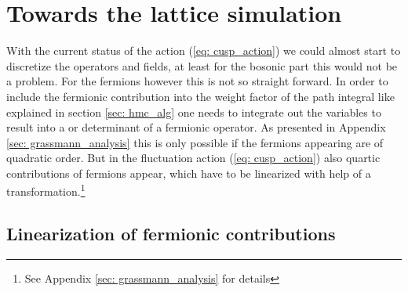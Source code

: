 \section{Towards the lattice simulation}
\label{sec: towards_lat}
With the current status of the action (\ref{eq: cusp_action}) we could almost start to discretize the operators and fields, at least for the bosonic part this would not be a problem. For the fermions however this is not so straight forward. In order to include the fermionic contribution into the weight factor of the path integral like explained in section \ref{sec: hmc_alg} one needs to integrate out the  variables to result into a  or determinant of a fermionic operator. As presented in Appendix \ref{sec: grassmann_analysis} this is only possible if the fermions appearing are of quadratic order. But in the fluctuation action (\ref{eq: cusp_action}) also quartic contributions of fermions appear, which have to be linearized with help of a  transformation.\footnote{See Appendix \ref{sec: grassmann_analysis} for details}
%
%
%
%
%
%
\subsection{Linearization of fermionic contributions}
